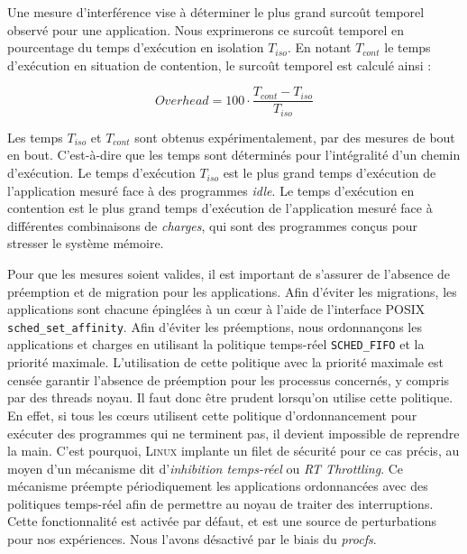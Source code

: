 
Une mesure d'interférence vise à déterminer le plus grand surcoût temporel observé pour une application.
Nous exprimerons ce surcoût temporel en pourcentage du temps d'exécution en isolation $T_{iso}$.
En notant $T_{cont}$ le temps d'exécution en situation de contention, le surcoût temporel est calculé ainsi :

\begin{equation}
	\label{equation:overhead}
	Overhead = 100 \cdot \frac{T_{cont} - T_{iso}}{T_{iso}}
\end{equation}

Les temps $T_{iso}$ et $T_{cont}$ sont obtenus expérimentalement, par des mesures de bout en bout.
C'est-à-dire que les temps sont déterminés pour l'intégralité d'un chemin d'exécution.
Le temps d'exécution $T_{iso}$ est le plus grand temps d'exécution de l'application mesuré face à des programmes \emph{idle}.
Le temps d'exécution en contention est le plus grand temps d'exécution de l'application mesuré face à différentes combinaisons de \emph{charges}, qui sont des programmes conçus pour stresser le système mémoire.

Pour que les mesures soient valides, il est important de s'assurer de l'absence de préemption et de migration pour les applications.
Afin d'éviter les migrations, les applications sont chacune épinglées à un cœur à l'aide de l'interface POSIX \texttt{sched\_set\_affinity}.
Afin d'éviter les préemptions, nous ordonnançons les applications et charges en utilisant la politique temps-réel \texttt{SCHED\_FIFO} et la priorité maximale.
L'utilisation de cette politique avec la priorité maximale est censée garantir l'absence de préemption pour les processus concernés, y compris par des threads noyau.
Il faut donc être prudent lorsqu'on utilise cette politique.
En effet, si tous les cœurs utilisent cette politique d'ordonnancement pour exécuter des programmes qui ne terminent pas, il devient impossible de reprendre la main.
C'est pourquoi, \textsc{Linux} implante un filet de sécurité pour ce cas précis, au moyen d'un mécanisme dit d'\emph{inhibition temps-réel} ou \emph{RT Throttling}.
Ce mécanisme préempte périodiquement les applications ordonnancées avec des politiques temps-réel afin de permettre au noyau de traiter des interruptions.
Cette fonctionnalité est activée par défaut, et est une source de perturbations pour nos expériences.
Nous l'avons désactivé par le biais du \emph{procfs}.

